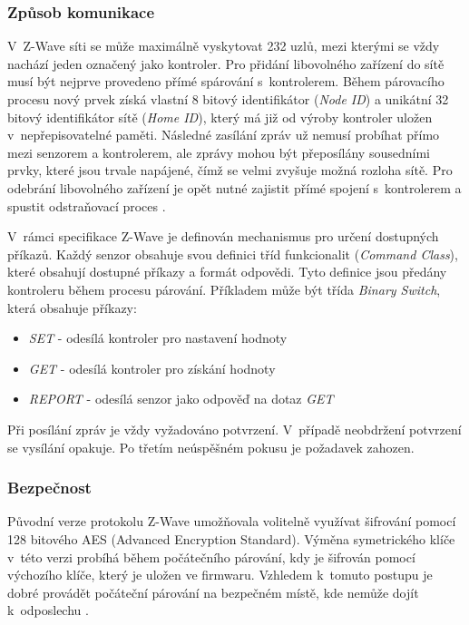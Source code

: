  \subsubsection{Způsob komunikace}
 V~Z-Wave síti se může maximálně vyskytovat 232 uzlů, mezi kterými se vždy nachází jeden označený
 jako kontroler. Pro přidání libovolného zařízení do sítě musí být nejprve provedeno přímé spárování
 s~kontrolerem. Během párovacího procesu nový prvek získá vlastní 8 bitový identifikátor (\textit{Node ID}) a 
 unikátní 32 bitový identifikátor sítě (\textit{Home ID}), který má již od výroby kontroler uložen v~nepřepisovatelné paměti.
 Následné zasílání zpráv už nemusí probíhat přímo mezi senzorem a kontrolerem, ale zprávy mohou
 být přeposílány sousedními prvky, které jsou trvale napájené, čímž se velmi zvyšuje možná rozloha sítě. 
 Pro odebrání libovolného zařízení je opět nutné zajistit přímé spojení s~kontrolerem a spustit odstraňovací
 proces \cite{cesnet-survey}.
 
 V~rámci specifikace Z-Wave \cite{zwave-spec} je definován mechanismus pro určení dostupných příkazů. Každý senzor obsahuje
 svou definici tříd funkcionalit (\textit{Command Class}), které obsahují dostupné příkazy a formát odpovědi. Tyto definice
 jsou předány kontroleru během procesu párování. Příkladem může být třída \textit{Binary Switch}, která obsahuje příkazy:
 \begin{itemize}
 \item \textit{SET} - odesílá kontroler pro nastavení hodnoty 
 \item \textit{GET} - odesílá kontroler pro získání hodnoty  
 \item \textit{REPORT} - odesílá senzor jako odpověď na dotaz \textit{GET} 
 \end{itemize} 
 
 Při posílání zpráv je vždy vyžadováno potvrzení. V~případě neobdržení potvrzení se vysílání opakuje. 
 Po třetím neúspěšném pokusu je požadavek zahozen.
 
 \subsubsection{Bezpečnost}
 Původní verze protokolu Z-Wave umožňovala volitelně využívat šifrování pomocí 128 bitového AES (Advanced Encryption Standard).
 Výměna symetrického klíče v~této verzi probíhá během počátečního párování, kdy je šifrován pomocí
 výchozího
 klíče, který je uložen ve firmwaru. Vzhledem k~tomuto postupu je dobré provádět počáteční párování na bezpečném
 místě, kde nemůže dojít k~odposlechu \cite{zwave-S0-attack}.
 
